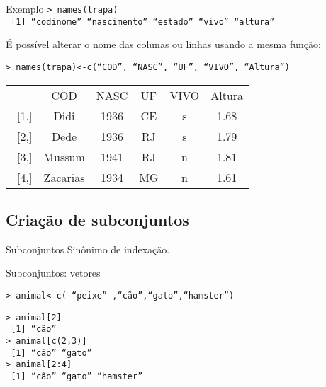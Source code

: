 \documentclass{beamer}
\begin{document}
\begin{frame}{Exemplo}
\texttt{> names(trapa)\\
~[1]  ``codinome''   ``nascimento'' ``estado''   ``vivo''  ``altura''}\vspace{10pt}

É possível alterar o nome das colunas ou linhas usando a mesma função:\\ \vspace{10pt}

\texttt{> names(trapa)<-c(``COD'', ``NASC'', ``UF'', ``VIVO'', ``Altura'')}

\begin{table}[!h]  
 \begin{tabular}{ cccccc} 
 & COD & NASC & UF & VIVO & Altura \\ 
~[1,] & Didi & 1936 & CE & s & 1.68 \\ 
~[2,] & Dede & 1936 & RJ & s & 1.79 \\ 
~[3,] & Mussum & 1941 & RJ & n & 1.81 \\ 
~[4,] & Zacarias & 1934 & MG & n & 1.61 \\ 
\end{tabular} 
\end{table}
\end{frame}

\subsection{Criação de subconjuntos}
\begin{frame}{Subconjuntos}
\centering
{}
\pause
Sinônimo de indexação.  
\end{frame}

\begin{frame}{Subconjuntos: vetores}

  \begin{center}
     
  \end{center}


\texttt{> animal<-c( ``peixe'' ,``cão'',``gato'',``hamster'')}  
\pause

\texttt{> animal[2]\\
~[1] ``cão''\\ \pause
> animal[c(2,3)]\\
~[1] ``cão''  ``gato''\\
> animal[2:4]\\
~[1] ``cão''     ``gato''    ``hamster''}
\end{frame}
\end{document}

